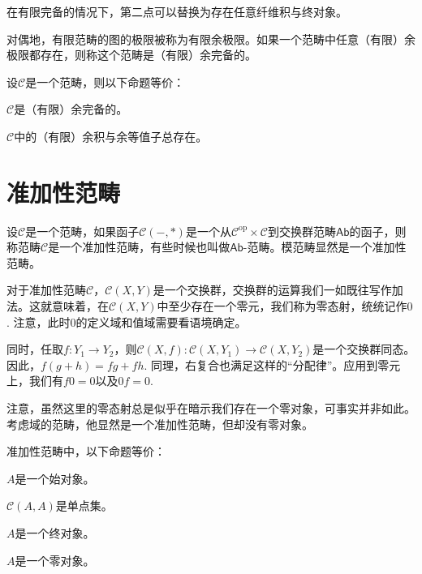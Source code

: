 在有限完备的情况下，第二点可以替换为存在任意纤维积与终对象。

\begin{para}
对偶地，有限范畴的图的极限被称为有限余极限。如果一个范畴中任意（有限）余极限都存在，则称这个范畴是（有限）余完备的。
\end{para}

\begin{thm}\label{yuwanbei}
设$\mathcal{C}$是一个范畴，则以下命题等价：
\begin{compactenum}[~~~~(1)]
\item $\mathcal{C}$是（有限）余完备的。
\item $\mathcal{C}$中的（有限）余积与余等值子总存在。
\end{compactenum}
\end{thm}

\section{准加性范畴}

\begin{para}
设$\mathcal{C}$是一个范畴，如果函子$\mathcal{C}(-,*)$是一个从$\mathcal{C}^\text{op}\times \mathcal{C}$到交换群范畴$\mathsf{Ab}$的函子，则称范畴$\mathcal{C}$是一个准加性范畴，有些时候也叫做$\mathsf{Ab}$-范畴。模范畴显然是一个准加性范畴。
\end{para}

对于准加性范畴$\mathcal{C}$，$\mathcal{C}(X,Y)$是一个交换群，交换群的运算我们一如既往写作加法。这就意味着，在$\mathcal{C}(X,Y)$中至少存在一个零元，我们称为零态射，统统记作$0$. 注意，此时$0$的定义域和值域需要看语境确定。

同时，任取$f:Y_1\to Y_2$，则$\mathcal{C}(X,f):\mathcal{C}(X,Y_1)\to \mathcal{C}(X,Y_2)$是一个交换群同态。因此，$f(g+h)=fg+fh$. 同理，右复合也满足这样的“分配律”。应用到零元上，我们有$f0=0$以及$0f=0$.

注意，虽然这里的零态射总是似乎在暗示我们存在一个零对象，可事实并非如此。考虑域的范畴，他显然是一个准加性范畴，但却没有零对象。

\begin{pro}\label{zeroobj}
准加性范畴中，以下命题等价：
\begin{compactenum}[~~~(1)]
\item $A$是一个始对象。
\item $\mathcal{C}(A,A)$是单点集。
\item $A$是一个终对象。
\item $A$是一个零对象。
\end{compactenum}
\end{pro}

